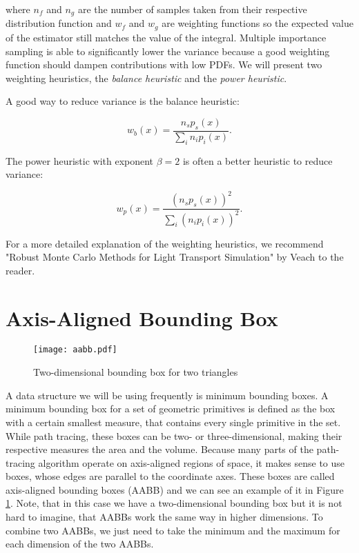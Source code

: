 where $n_f$ and $n_g$ are the number of samples taken from their respective distribution function and $w_f$ and $w_g$ are weighting functions so the expected value of the estimator still matches the value of the integral. Multiple importance sampling is able to significantly lower the variance because a good weighting function should dampen contributions with low PDFs. We will present two weighting heuristics, the \textit{balance heuristic} and the \textit{power heuristic}.

A good way to reduce variance is the balance heuristic:

\begin{equation}
w_b(x) = \frac{n_s p_s(x)}{\sum_{i}n_i p_i(x)}.
\end{equation}

The power heuristic with exponent $\beta = 2$ is often a better heuristic to reduce variance:

\begin{equation}
w_p(x) = \frac{(n_s p_s(x))^2}{\sum_{i}(n_i p_i(x))^2}.
\end{equation}

For a more detailed explanation of the weighting heuristics, we recommend "Robust Monte Carlo Methods for Light Transport Simulation" by Veach to the reader. \cite{RMCM}

\section{Axis-Aligned Bounding Box}
\label{sec:aabb}
\begin{figure}
	\begin{center}
		\texttt{[image: aabb.pdf]}
		\caption{Two-dimensional bounding box for two triangles}
		\label{fig:aabb}
	\end{center}
\end{figure}

A data structure we will be using frequently is minimum bounding boxes. A minimum bounding box for a set of geometric primitives is defined as the box with a certain smallest measure, that contains every single primitive in the set. While path tracing, these boxes can be two- or three-dimensional, making their respective measures the area and the volume. Because many parts of the path-tracing algorithm operate on axis-aligned regions of space, it makes sense to use boxes, whose edges are parallel to the coordinate axes. These boxes are called axis-aligned bounding boxes (AABB) and we can see an example of it in Figure {\ref{fig:aabb}}. Note, that in this case we have a two-dimensional bounding box but it is not hard to imagine, that AABBs work the same way in higher dimensions. To combine two AABBs, we just need to take the minimum and the maximum for each dimension of the two AABBs.

